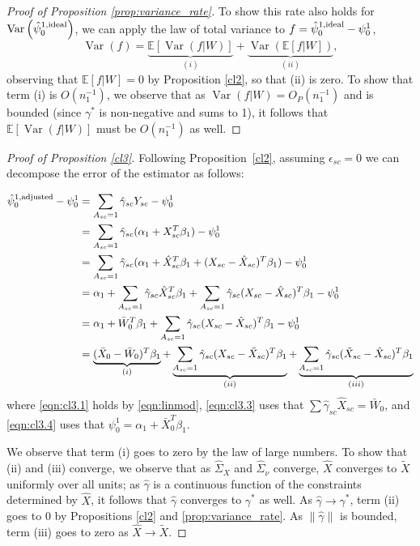 \begin{proof}[Proof of Proposition \ref{prop:variance_rate}]
To show this rate also holds for $\operatorname{Var}\left(\hat{\psi}_0^{1,\textup{ideal}}\right)$, we can apply the law of total variance to $f = \hat{\psi}_0^{1,\textup{ideal}} - \psi_0^1$, %
\[ \operatorname{Var}(f) = \underbrace{\mathbb{E}[\operatorname{Var}(f|W)]}_{(i)} + \underbrace{\operatorname{Var}(\mathbb{E}[f|W])}_{(ii)}, \]
observing that $\mathbb{E}[f|W] = 0$ by Proposition \ref{cl2}, so that (ii) is zero. To show that term (i) is $O(n_1^{-1})$, we observe that as $\operatorname{Var}(f|W) = O_P(n_1^{-1})$ and is bounded (since $\gamma^*$ is non-negative and sums to 1), it follows that  $\mathbb{E}[ \operatorname{Var}(f|W)]$ must be $O(n_1^{-1})$ as well.
\end{proof}

\begin{proof}[Proof of Proposition \ref{cl3}]
Following Proposition~\ref{cl2}, assuming $\epsilon_{sc}=0$ we can decompose the error of the estimator as follows:

\begin{align}
\nonumber    \hat{\psi}^{1,\textup{adjusted}}_0 - \psi_0^1 &= \sum_{A_{sc}=1} \hat{\gamma}_{sc} Y_{sc} - \psi_0^1 \\
    & = \sum_{A_{sc}=1} \hat{\gamma}_{sc} (\alpha_1 + X_{sc}^T \beta_1) - \psi_0^1 \label{eqn:cl3.1}\\
    \nonumber & = \sum_{A_{sc}=1} \hat{\gamma}_{sc} (\alpha_1 + \hat{X}_{sc}^T \beta_1 + (X_{sc} - \hat{X}_{sc})^T \beta_1 ) - \psi_0^1 \label{eqn:cl3.2}\\
    \nonumber & = \alpha_1 + \sum_{A_{sc}=1} \hat{\gamma}_{sc} \hat{X}_{sc}^T \beta_1 + \sum_{A_{sc}=1} \hat{\gamma}_{sc}(X_{sc} - \hat{X}_{sc})^T \beta_1  - \psi_0^1 \label{eqn:cl3.3}\\
    & = \alpha_1 + \bar{W}_0^T \beta_1 + \sum_{A_{sc}=1} \hat{\gamma}_{sc}(X_{sc} - \hat{X}_{sc})^T \beta_1  - \psi_0^1 \label{eqn:cl3.3}\\
    & = \underbrace{(\bar{X}_0 - \bar{W}_0)^T \beta_1}_{(i)} + \underbrace{\sum_{A_{sc}=1} \hat{\gamma}_{sc}(X_{sc} - \tilde{X}_{sc})^T \beta_1}_{(ii)} + \underbrace{\sum_{A_{sc}=1} \hat{\gamma}_{sc} (\tilde{X}_{sc} - \hat{X}_{sc})^T \beta_1}_{(iii)} \label{eqn:cl3.4}
\end{align}
where \eqref{eqn:cl3.1} holds by \eqref{eqn:linmod}, \eqref{eqn:cl3.3} uses that $\sum \hat{\gamma}_{sc} \hat{X}_{sc} = \bar{W}_0$, and \eqref{eqn:cl3.4} uses that $\psi_{0}^1 = \alpha_1 + \bar{X}_0^T \beta_1$.

We observe that term (i) goes to zero by the law of large numbers. To show that (ii) and (iii) converge, we observe that as  $\hat{\Sigma}_X$ and $\hat{\Sigma}_\nu$ converge, $\hat{X}$ converges to $\tilde{X}$ uniformly over all units; as $\hat{\gamma}$ is a continuous function of the constraints determined by $\hat{X}$, it follows that $\hat{\gamma}$ converges to $\gamma^*$ as well. As $\hat{\gamma} \to \gamma^*$, term (ii) goes to 0 by Propositions \ref{cl2} and \ref{prop:variance_rate}. As $\|\hat{\gamma}\|$ is bounded, term (iii) goes to zero as $\hat{X} \to \tilde{X}$.

\end{proof}

